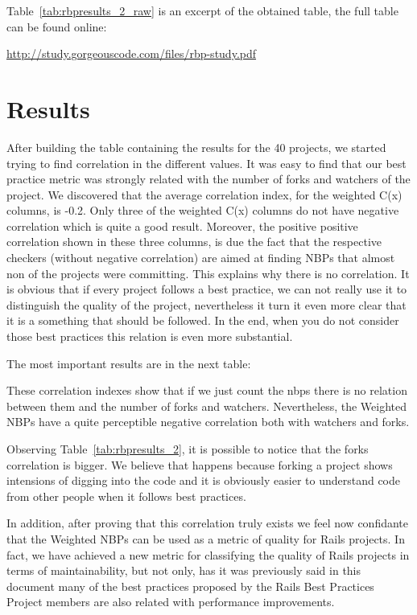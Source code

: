 
Table~\ref{tab:rbpresults_2_raw} is an excerpt of the obtained table, the full table can be found online: 

\url{http://study.gorgeouscode.com/files/rbp-study.pdf}




\section{Results}\label{subsec:results}
After building the table containing the results for the 40 projects, 
we started trying to find correlation in the different values. 
It was easy to find that our best practice metric was strongly related with the number of forks and watchers of the project.
We discovered that the average correlation index, for the weighted C(x) columns, is -0.2. 
Only three of the weighted C(x) columns do not have negative correlation which is quite a good result. 
Moreover, the positive positive correlation shown in these three columns,
is due the fact that the respective checkers (without negative correlation) are
aimed at finding NBPs that almost non of the projects were committing.
This explains why there is no correlation.
It is obvious that if every project follows a best practice, we can not really use it to distinguish the quality of the project, 
nevertheless it turn it even more clear that it is a something that should be followed.
In the end, when you do not consider those best practices this relation is even more substantial.


The most important results are in the next table:


These correlation indexes show that if we just count the nbps there is no relation between them and the number of forks and watchers. Nevertheless, the Weighted NBPs have a quite perceptible negative correlation both with watchers and forks. 

Observing Table~\ref{tab:rbpresults_2}, it is possible to notice that the forks correlation is bigger. 
We believe that happens because forking a project shows intensions of digging into the code and 
it is obviously easier to understand code from other people when it follows best practices.

In addition, after proving that this correlation truly exists we feel now confidante that 
the Weighted NBPs can be used as a metric of quality for Rails projects.
In fact, we have achieved a new metric for classifying the quality of Rails projects in terms of maintainability,
but not only, has it was previously said in this document many of the best practices
proposed by the Rails Best Practices Project members are also related with performance improvements.

